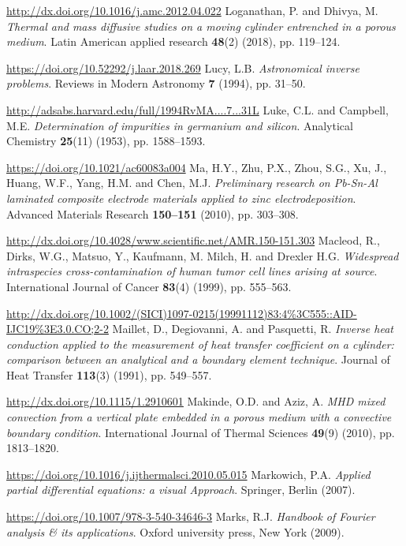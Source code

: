 \begin{thebibliography}{301}
\url{http://dx.doi.org/10.1016/j.amc.2012.04.022} 
%
%
 Loganathan, P. and Dhivya, M. {\it Thermal and mass diffusive studies on a moving cylinder entrenched in a porous medium}. Latin American applied research {\bf 48}(2) (2018), pp. 119--124.

\url{https://doi.org/10.52292/j.laar.2018.269}
%
%
 Lucy, L.B. {\it Astronomical inverse problems}. Reviews in Modern Astronomy {\bf 7} (1994), pp. 31--50.

\url{http://adsabs.harvard.edu/full/1994RvMA....7...31L}
%
%
 Luke, C.L. and Campbell, M.E. {\it Determination of impurities in germanium and silicon}. Analytical Chemistry {\bf 25}(11) (1953), pp. 1588--1593.

\url{https://doi.org/10.1021/ac60083a004}
%
%
 Ma, H.Y., Zhu, P.X., Zhou, S.G., Xu, J., Huang, W.F., Yang, H.M. and Chen, M.J. {\it Preliminary research on Pb-Sn-Al laminated composite electrode materials applied to zinc electrodeposition}. Advanced Materials Research {\bf 150--151} (2010), pp. 303--308.

\url{http://dx.doi.org/10.4028/www.scientific.net/AMR.150-151.303} 
%
%
 Macleod, R., Dirks, W.G., Matsuo, Y., Kaufmann, M. Milch, H. and Drexler H.G. {\it Widespread intraspecies cross-contamination of human tumor cell lines arising at source}. International Journal of Cancer {\bf 83}(4) (1999), pp. 555--563.

\url{http://dx.doi.org/10.1002/(SICI)1097-0215(19991112)83:4\%3C555::AID-IJC19\%3E3.0.CO;2-2} 
%
 Maillet, D., Degiovanni, A. and Pasquetti, R. {\it Inverse heat conduction applied to the measurement of heat transfer coefficient on a cylinder: comparison between an analytical and a boundary element technique}. Journal of Heat Transfer {\bf 113}(3) (1991), pp. 549--557.

\url{http://dx.doi.org/10.1115/1.2910601}
%
%
 Makinde, O.D. and Aziz, A. {\it MHD mixed convection from a vertical plate embedded in a porous medium with a convective boundary condition}. International Journal of Thermal Sciences {\bf 49}(9) (2010), pp. 1813--1820.

\url{https://doi.org/10.1016/j.ijthermalsci.2010.05.015}
%
%
 Markowich, P.A. {\it Applied partial differential equations: a visual Approach}. Springer, Berlin (2007).

\url{https://doi.org/10.1007/978-3-540-34646-3}
%
%
 Marks, R.J. {\it Handbook of Fourier analysis \& its applications}. Oxford university press, New York (2009). 


\end{thebibliography}
